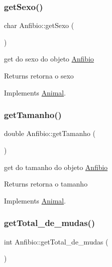 \subsubsection{\texorpdfstring{getSexo()}{getSexo()}}
{\footnotesize\ttfamily char Anfibio\+::get\+Sexo (\begin{DoxyParamCaption}{ }\end{DoxyParamCaption})\hspace{0.3cm}{\ttfamily [virtual]}}



get do sexo do objeto \mbox{\hyperlink{class_anfibio}{Anfibio}} 

\begin{DoxyReturn}{Returns}
retorna o sexo 
\end{DoxyReturn}


Implements \mbox{\hyperlink{class_animal}{Animal}}.

\mbox{\label{class_anfibio_a4040a81799cdd24294d4ee51d8f74b0c}} 
\subsubsection{\texorpdfstring{getTamanho()}{getTamanho()}}
{\footnotesize\ttfamily double Anfibio\+::get\+Tamanho (\begin{DoxyParamCaption}{ }\end{DoxyParamCaption})\hspace{0.3cm}{\ttfamily [virtual]}}



get do tamanho do objeto \mbox{\hyperlink{class_anfibio}{Anfibio}} 

\begin{DoxyReturn}{Returns}
retorna o tamanho 
\end{DoxyReturn}


Implements \mbox{\hyperlink{class_animal}{Animal}}.

\mbox{\label{class_anfibio_a1930bcc1ef46d0aa34374ba5c24db720}} 
\subsubsection{\texorpdfstring{getTotal\_de\_mudas()}{getTotal\_de\_mudas()}}
{\footnotesize\ttfamily int Anfibio\+::get\+Total\+\_\+de\+\_\+mudas (\begin{DoxyParamCaption}{ }\end{DoxyParamCaption})}



